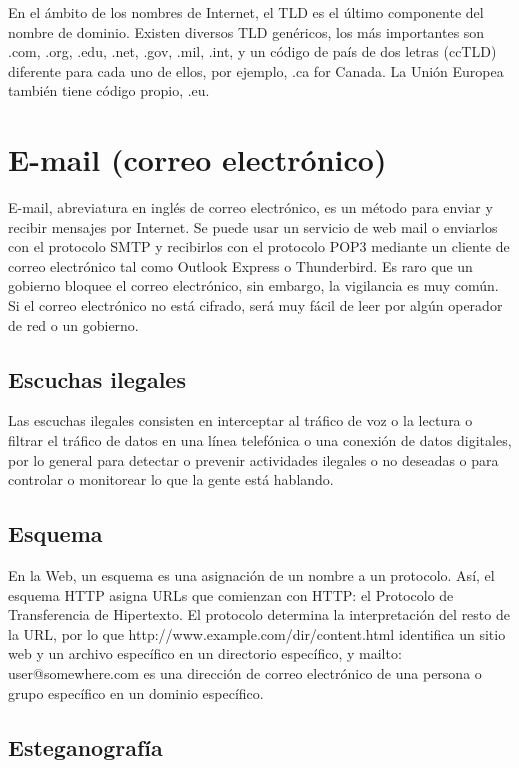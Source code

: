 En el ámbito de los nombres de Internet, el TLD es el último componente
del nombre de dominio. Existen diversos TLD genéricos, los más
importantes son .com, .org, .edu, .net, .gov, .mil, .int, y un código de
país de dos letras (ccTLD) diferente para cada uno de ellos, por
ejemplo, .ca for Canada. La Unión Europea también tiene código propio,
.eu.

\section{E-mail (correo
electrónico)}\label{e-mail-correo-electruxf3nico}

E-mail, abreviatura en inglés de correo electrónico, es un método para
enviar y recibir mensajes por Internet. Se puede usar un servicio de web
mail o enviarlos con el protocolo SMTP y recibirlos con el protocolo
POP3 mediante un cliente de correo electrónico tal como Outlook Express
o Thunderbird. Es raro que un gobierno bloquee el correo electrónico,
sin embargo, la vigilancia es muy común. Si el correo electrónico no
está cifrado, será muy fácil de leer por algún operador de red o un
gobierno.

\subsection{Escuchas ilegales}\label{escuchas-ilegales}

Las escuchas ilegales consisten en interceptar al tráfico de voz o la
lectura o filtrar el tráfico de datos en una línea telefónica o una
conexión de datos digitales, por lo general para detectar o prevenir
actividades ilegales o no deseadas o para controlar o monitorear lo que
la gente está hablando.

\subsection{Esquema}\label{esquema}

En la Web, un esquema es una asignación de un nombre a un protocolo.
Así, el esquema HTTP asigna URLs que comienzan con HTTP: el Protocolo de
Transferencia de Hipertexto. El protocolo determina la interpretación
del resto de la URL, por lo que http://www.example.com/dir/content.html
identifica un sitio web y un archivo específico en un directorio
específico, y mailto: user@somewhere.com es una dirección de correo
electrónico de una persona o grupo específico en un dominio específico.

\subsection{Esteganografía}\label{esteganografuxeda}

